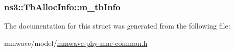 \subsubsection[{\texorpdfstring{m\+\_\+tb\+Info}{m_tbInfo}}]{ ns3\+::\+Tb\+Alloc\+Info\+::m\+\_\+tb\+Info}\hypertarget{structns3_1_1TbAllocInfo_ace7eb83c6b9309c5047864325db62215}{}\label{structns3_1_1TbAllocInfo_ace7eb83c6b9309c5047864325db62215}


The documentation for this struct was generated from the following file\+:\begin{DoxyCompactItemize}
\item 
mmwave/model/\hyperlink{mmwave-phy-mac-common_8h}{mmwave-\/phy-\/mac-\/common.\+h}\end{DoxyCompactItemize}
